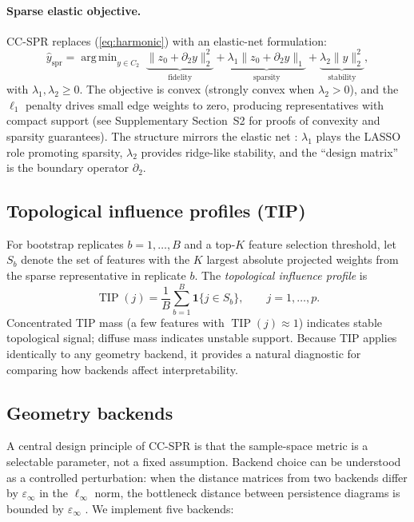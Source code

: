 \documentclass[12pt]{article}
\DeclareMathOperator{\TIP}{TIP}
\DeclareMathOperator*{\argmin}{arg\,min}
\begin{document}
\paragraph{Sparse elastic objective.}
CC-SPR replaces (\ref{eq:harmonic}) with an elastic-net formulation:
\begin{equation}\label{eq:ccspr}
\hat{y}_{\mathrm{spr}} = \argmin_{y \in C_2} \;\underbrace{\| z_0 + \partial_2 y \|_2^2}_{\text{fidelity}} + \underbrace{\lambda_1 \| z_0 + \partial_2 y \|_1}_{\text{sparsity}} + \underbrace{\lambda_2 \| y \|_2^2}_{\text{stability}},
\end{equation}
with $\lambda_1, \lambda_2 \ge 0$.
The objective is convex (strongly convex when $\lambda_2 > 0$), and the $\ell_1$ penalty drives small edge weights to zero, producing representatives with compact support (see Supplementary Section~S2 for proofs of convexity and sparsity guarantees).
The structure mirrors the elastic net \cite{zou2005elasticnet}: $\lambda_1$ plays the LASSO role promoting sparsity, $\lambda_2$ provides ridge-like stability, and the ``design matrix'' is the boundary operator $\partial_2$.

\subsection{Topological influence profiles (TIP)}
\label{sec:tip}

For bootstrap replicates $b = 1, \ldots, B$ and a top-$K$ feature selection threshold, let $S_b$ denote the set of features with the $K$ largest absolute projected weights from the sparse representative in replicate $b$.
The \emph{topological influence profile} is
\[
\TIP(j) = \frac{1}{B} \sum_{b=1}^B \mathbf{1}\{j \in S_b\}, \qquad j = 1, \ldots, p.
\]
Concentrated TIP mass (a few features with $\TIP(j) \approx 1$) indicates stable topological signal; diffuse mass indicates unstable support.
Because TIP applies identically to any geometry backend, it provides a natural diagnostic for comparing how backends affect interpretability.

\subsection{Geometry backends}
\label{sec:backends}

A central design principle of CC-SPR is that the sample-space metric is a selectable parameter, not a fixed assumption.
Backend choice can be understood as a controlled perturbation: when the distance matrices from two backends differ by $\varepsilon_\infty$ in the $\ell_\infty$ norm, the bottleneck distance between persistence diagrams is bounded by $\varepsilon_\infty$ \cite{chazal2014persistence}.
We implement five backends:
\end{document}
